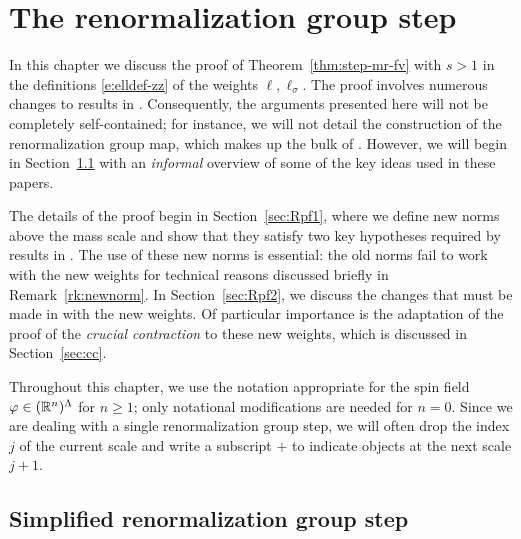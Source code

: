 \chapter{The renormalization group step}
\label{sec:RGstep}

\setcounter{footnote}{0}

\renewcommand{\Vpt}{\Vp_\pt}


In this chapter we discuss the proof of Theorem~\ref{thm:step-mr-fv}
with $s > 1$ in the definitions \eqref{e:elldef-zz} of the weights
$\ell, \ell_\sigma$. The proof involves numerous changes
to results in \cite{BS-rg-loc,BS-rg-IE,BS-rg-step}.
Consequently, the arguments presented here will not be completely self-contained;
for instance, we will not detail the construction of the renormalization group
map, which makes up the bulk of \cite{BS-rg-step}.
However, we will begin in Section~\ref{sec:rgmech} with an \emph{informal} overview
of some of the key ideas used in these papers.

The details of the proof begin in Section~\ref{sec:Rpf1}, where we define new
norms above the mass scale and show that they satisfy two key hypotheses required
by results in \cite{BS-rg-IE}. The use of these new norms is essential: the old
norms fail to work with the new weights for technical reasons discussed briefly
in Remark~\ref{rk:newnorm}. In Section~\ref{sec:Rpf2}, we discuss the changes that
must be made in \cite{BS-rg-loc,BS-rg-IE} with the new weights. Of particular
importance is the adaptation of the proof of the \emph{crucial contraction} to
these new weights, which is discussed in Section~\ref{sec:cc}.

Throughout this chapter, we use the notation appropriate for the spin field
$\varphi \in ({\mathbb R}^n)^\Lambda$ for $n \ge 1$; only notational modifications are
needed for $n=0$.
Since we are dealing with a single renormalization group step, we will often
drop the index $j$ of the current scale and write a subscript $+$ to indicate
objects at the next scale $j + 1$.


\section{Simplified renormalization group step}
\label{sec:rgmech}

